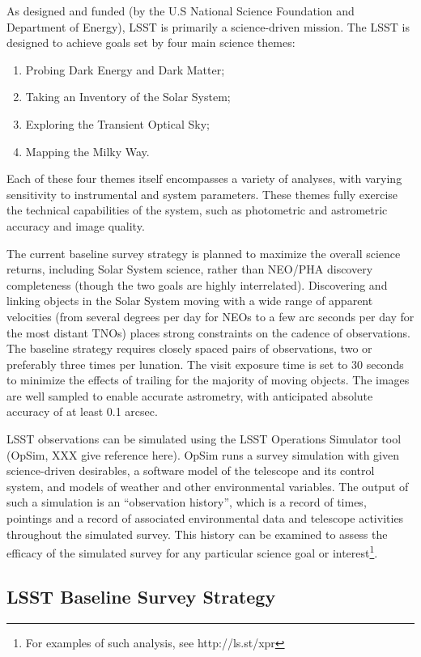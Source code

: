As designed and funded (by the U.S National Science Foundation and
Department of Energy), LSST is primarily a science-driven mission. 
The LSST is designed to achieve goals set by four main science themes:
\begin{enumerate}
\item Probing Dark Energy and Dark Matter;
\item Taking an Inventory of the Solar System;
\item Exploring the Transient Optical Sky;
\item Mapping the Milky Way.
\end{enumerate}
Each of these four themes itself encompasses a variety of analyses, with 
varying sensitivity to instrumental and system parameters. These themes 
fully exercise the technical capabilities of the system, such as photometric 
and astrometric accuracy and image quality. 

The current baseline survey strategy is planned to maximize the overall science returns, including 
Solar System science, rather than NEO/PHA discovery completeness (though the 
two goals are highly interrelated). Discovering and linking objects in the Solar System 
moving with a wide range of apparent velocities (from several degrees per day for 
NEOs to a few arc seconds per day for the most distant TNOs) places strong 
constraints on the cadence of observations. The baseline strategy requires closely 
spaced pairs of observations, two or preferably three times per lunation. The visit
exposure time is set to 30 seconds to minimize the effects of trailing for the majority of 
moving objects. The images are well sampled to enable accurate astrometry, with 
anticipated absolute accuracy of at least 0.1 arcsec.

LSST observations can be simulated using the LSST Operations Simulator tool (OpSim, XXX give
reference here). OpSim runs a survey simulation with given science-driven desirables, 
a software model of the telescope and its control system, and models of weather and other 
environmental variables. The output of such a simulation is an ``observation history'', which 
is a record of times, pointings and a record of associated environmental data and telescope  
activities throughout the simulated survey.  This history can be examined to assess  
the efficacy of the simulated survey for any particular science goal or 
interest\footnote{For examples of such analysis, see http://ls.st/xpr}. 


\subsection{LSST Baseline Survey Strategy}


